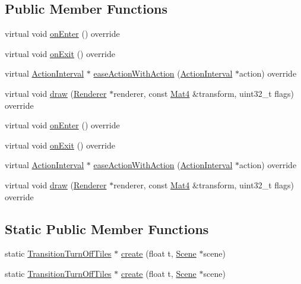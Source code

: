 \subsection*{Public Member Functions}
\begin{DoxyCompactItemize}
\item 
virtual void \hyperlink{classTransitionTurnOffTiles_ae0dc8ca8038400db02d3ed87a594481a}{on\+Enter} () override
\item 
virtual void \hyperlink{classTransitionTurnOffTiles_ad178c23408dd18b341e043ae5d645499}{on\+Exit} () override
\item 
virtual \hyperlink{classActionInterval}{Action\+Interval} $\ast$ \hyperlink{classTransitionTurnOffTiles_ab97d4817adc0214335c27b055ef29631}{ease\+Action\+With\+Action} (\hyperlink{classActionInterval}{Action\+Interval} $\ast$action) override
\item 
virtual void \hyperlink{classTransitionTurnOffTiles_a467ba195c2e7d161fd31436362734968}{draw} (\hyperlink{classRenderer}{Renderer} $\ast$renderer, const \hyperlink{classMat4}{Mat4} \&transform, uint32\+\_\+t flags) override
\item 
virtual void \hyperlink{classTransitionTurnOffTiles_aa32c923595c2e6c212c16f07958cc72b}{on\+Enter} () override
\item 
virtual void \hyperlink{classTransitionTurnOffTiles_a690a28870ab7e338aa4645134869f520}{on\+Exit} () override
\item 
virtual \hyperlink{classActionInterval}{Action\+Interval} $\ast$ \hyperlink{classTransitionTurnOffTiles_a0aa4b9097d9dce78011713c44e3cd4b8}{ease\+Action\+With\+Action} (\hyperlink{classActionInterval}{Action\+Interval} $\ast$action) override
\item 
virtual void \hyperlink{classTransitionTurnOffTiles_adadbe8ec95b4e789ffe4659a7d03fa43}{draw} (\hyperlink{classRenderer}{Renderer} $\ast$renderer, const \hyperlink{classMat4}{Mat4} \&transform, uint32\+\_\+t flags) override
\end{DoxyCompactItemize}
\subsection*{Static Public Member Functions}
\begin{DoxyCompactItemize}
\item 
static \hyperlink{classTransitionTurnOffTiles}{Transition\+Turn\+Off\+Tiles} $\ast$ \hyperlink{classTransitionTurnOffTiles_a48d64044718b506ad3c84e38664c938f}{create} (float t, \hyperlink{classScene}{Scene} $\ast$scene)
\item 
static \hyperlink{classTransitionTurnOffTiles}{Transition\+Turn\+Off\+Tiles} $\ast$ \hyperlink{classTransitionTurnOffTiles_a33900f50c002668aefb782838bd9cb14}{create} (float t, \hyperlink{classScene}{Scene} $\ast$scene)
\end{DoxyCompactItemize}
